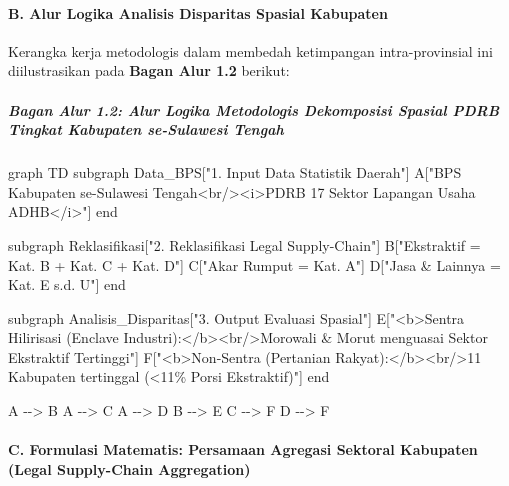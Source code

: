 \documentclass[
]{article}
\newenvironment{Shaded}{}{}
\newcommand{\NormalTok}[1]{#1}
\begin{document}
\paragraph{B. Alur Logika Analisis Disparitas Spasial
Kabupaten}\label{b.-alur-logika-analisis-disparitas-spasial-kabupaten}

Kerangka kerja metodologis dalam membedah ketimpangan intra-provinsial
ini diilustrasikan pada \textbf{Bagan Alur 1.2} berikut:

\subparagraph{Bagan Alur 1.2: Alur Logika Metodologis Dekomposisi
Spasial PDRB Tingkat Kabupaten se-Sulawesi
Tengah}\label{bagan-alur-1.2-alur-logika-metodologis-dekomposisi-spasial-pdrb-tingkat-kabupaten-se-sulawesi-tengah}

\begin{Shaded}
\begin{Highlighting}[]
\NormalTok{graph TD}
\NormalTok{    subgraph Data\_BPS["1. Input Data Statistik Daerah"]}
\NormalTok{        A["BPS Kabupaten se{-}Sulawesi Tengah\textless{}br/\textgreater{}\textless{}i\textgreater{}PDRB 17 Sektor Lapangan Usaha ADHB\textless{}/i\textgreater{}"]}
\NormalTok{    end}

\NormalTok{    subgraph Reklasifikasi["2. Reklasifikasi Legal Supply{-}Chain"]}
\NormalTok{        B["Ekstraktif = Kat. B + Kat. C + Kat. D"]}
\NormalTok{        C["Akar Rumput = Kat. A"]}
\NormalTok{        D["Jasa \& Lainnya = Kat. E s.d. U"]}
\NormalTok{    end}

\NormalTok{    subgraph Analisis\_Disparitas["3. Output Evaluasi Spasial"]}
\NormalTok{        E["\textless{}b\textgreater{}Sentra Hilirisasi (Enclave Industri):\textless{}/b\textgreater{}\textless{}br/\textgreater{}Morowali \& Morut menguasai Sektor Ekstraktif Tertinggi"]}
\NormalTok{        F["\textless{}b\textgreater{}Non{-}Sentra (Pertanian Rakyat):\textless{}/b\textgreater{}\textless{}br/\textgreater{}11 Kabupaten tertinggal (\textless{}11\% Porsi Ekstraktif)"]}
\NormalTok{    end}

\NormalTok{    A {-}{-}\textgreater{} B}
\NormalTok{    A {-}{-}\textgreater{} C}
\NormalTok{    A {-}{-}\textgreater{} D}
\NormalTok{    B {-}{-}\textgreater{} E}
\NormalTok{    C {-}{-}\textgreater{} F}
\NormalTok{    D {-}{-}\textgreater{} F}
\end{Highlighting}
\end{Shaded}

\paragraph{C. Formulasi Matematis: Persamaan Agregasi Sektoral Kabupaten
(Legal Supply-Chain
Aggregation)}\label{c.-formulasi-matematis-persamaan-agregasi-sektoral-kabupaten-legal-supply-chain-aggregation}
\end{document}
